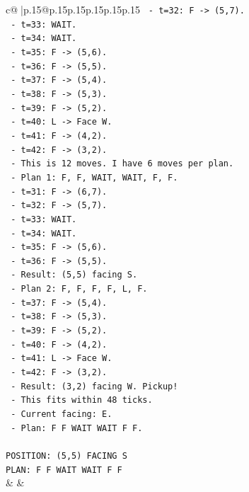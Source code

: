 \documentclass{article}
\begin{document}
{\begin{supertabular}{c@{$\;$}|p{.15\linewidth}@{}p{.15\linewidth}p{.15\linewidth}p{.15\linewidth}p{.15\linewidth}p{.15\linewidth}}
{{{\texttt{        {-} t=32: F {-}> (5,7).} \\
\texttt{        {-} t=33: WAIT.} \\
\texttt{        {-} t=34: WAIT.} \\
\texttt{        {-} t=35: F {-}> (5,6).} \\
\texttt{        {-} t=36: F {-}> (5,5).} \\
\texttt{        {-} t=37: F {-}> (5,4).} \\
\texttt{        {-} t=38: F {-}> (5,3).} \\
\texttt{        {-} t=39: F {-}> (5,2).} \\
\texttt{        {-} t=40: L {-}> Face W.} \\
\texttt{        {-} t=41: F {-}> (4,2).} \\
\texttt{        {-} t=42: F {-}> (3,2).} \\
\texttt{      {-} This is 12 moves. I have 6 moves per plan.} \\
\texttt{      {-} Plan 1: F, F, WAIT, WAIT, F, F.} \\
\texttt{        {-} t=31: F {-}> (6,7).} \\
\texttt{        {-} t=32: F {-}> (5,7).} \\
\texttt{        {-} t=33: WAIT.} \\
\texttt{        {-} t=34: WAIT.} \\
\texttt{        {-} t=35: F {-}> (5,6).} \\
\texttt{        {-} t=36: F {-}> (5,5).} \\
\texttt{        {-} Result: (5,5) facing S.} \\
\texttt{      {-} Plan 2: F, F, F, F, L, F.} \\
\texttt{        {-} t=37: F {-}> (5,4).} \\
\texttt{        {-} t=38: F {-}> (5,3).} \\
\texttt{        {-} t=39: F {-}> (5,2).} \\
\texttt{        {-} t=40: F {-}> (4,2).} \\
\texttt{        {-} t=41: L {-}> Face W.} \\
\texttt{        {-} t=42: F {-}> (3,2).} \\
\texttt{        {-} Result: (3,2) facing W. Pickup!} \\
\texttt{      {-} This fits within 48 ticks.} \\
\texttt{      {-} Current facing: E.} \\
\texttt{      {-} Plan: F F WAIT WAIT F F.} \\
\\ 
\texttt{POSITION: (5,5) FACING S} \\
\texttt{PLAN: F F WAIT WAIT F F} \\
            }
        }
    }
    & & \\ \\


\end{supertabular}}
\end{document}
